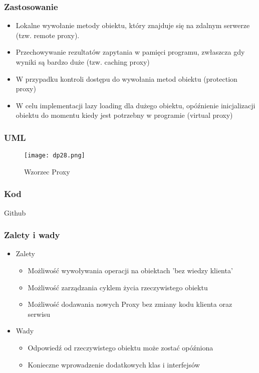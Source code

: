 \documentclass[a4paper,15pt]{article}
\begin{document}
\subsubsection{Zastosowanie}
\begin{itemize}
\item Lokalne wywołanie metody obiektu, który znajduje się na zdalnym serwerze (tzw. remote proxy).
\item Przechowywanie rezultatów zapytania w pamięci programu, zwłaszcza gdy wyniki są bardzo duże (tzw. caching proxy)
\item W przypadku kontroli dostępu do wywołania metod obiektu (protection proxy)
\item W celu implementacji lazy loading dla dużego obiektu, opóźnienie inicjalizacji obiektu do momentu kiedy jest potrzebny w programie (virtual proxy)
\end{itemize}

\subsubsection{UML}

\begin{figure}[H]
\centering
  \texttt{[image: dp28.png]}
  \caption{Wzorzec Proxy}
\end{figure}

\subsubsection{Kod}
Github

\subsubsection{Zalety i wady}


\begin{itemize}
\item Zalety
\begin{itemize}
\item Możliwość wywoływania operacji na obiektach 'bez wiedzy klienta'
\item Możliwość zarządzania cyklem życia rzeczywistego obiektu
\item Możliwość dodawania nowych Proxy bez zmiany kodu klienta oraz serwisu
\end{itemize}
\item Wady
\begin{itemize}
\item Odpowiedź od rzeczywistego obiektu może zostać opóźniona
\item Konieczne wprowadzenie dodatkowych klas i interfejsów
\end{itemize}
\end{itemize}
\end{document}
